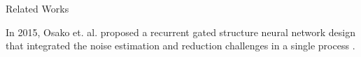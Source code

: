 Related Works

In 2015, Osako et. al. proposed a recurrent gated structure neural network design that integrated the noise estimation and reduction challenges in a single process \cite{ref:osako2015denoising}.
